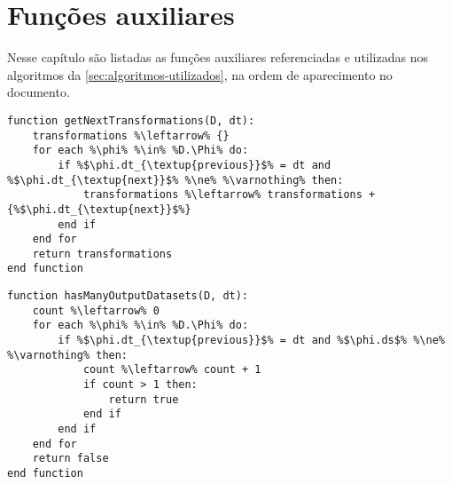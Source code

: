 
\chapter{Funções auxiliares}%
\label{app:funcoes-auxiliares}

Nesse capítulo são listadas as funções auxiliares referenciadas e utilizadas nos algoritmos da \autoref{sec:algoritmos-utilizados}, na ordem de aparecimento no documento.

\vfill{}

\begin{minipage}[c]{0.95\textwidth}
\begin{lstlisting}[language=pseudocode,label={lst:get-next-transformations},caption={[Obtenção das próximas transformações de dados de uma transformação]Obtenção das próximas transformações de dados de uma transformação de dados.}]
function getNextTransformations(D, dt):
    transformations %\leftarrow% {}
    for each %\phi% %\in% %D.\Phi% do:
        if %$\phi.dt_{\textup{previous}}$% = dt and %$\phi.dt_{\textup{next}}$% %\ne% %\varnothing% then:
            transformations %\leftarrow% transformations + {%$\phi.dt_{\textup{next}}$%}
        end if
    end for
    return transformations
end function
\end{lstlisting}
\end{minipage}

\vfill{}

\begin{minipage}[c]{0.95\textwidth} \begin{lstlisting}[language=pseudocode,label={lst:has-many-output-datasets},caption={[Contagem dos conjuntos de dados de saída de uma transformação]Contagem dos conjuntos de dados de saída de uma transformação de dados. Retorna verdadeiro caso essa quantidade seja maior do que 1, e falso caso contrário.}]
function hasManyOutputDatasets(D, dt):
    count %\leftarrow% 0
    for each %\phi% %\in% %D.\Phi% do:
        if %$\phi.dt_{\textup{previous}}$% = dt and %$\phi.ds$% %\ne% %\varnothing% then:
            count %\leftarrow% count + 1
            if count > 1 then:
                return true
            end if
        end if
    end for
    return false
end function
\end{lstlisting}
\end{minipage}

\vfill{}

